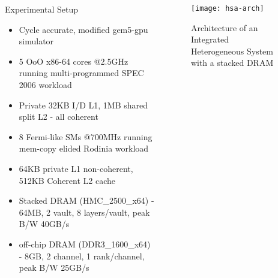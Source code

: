 \documentclass[final,t]{beamer}
\begin{document}
\begin{frame}[t,fragile]{}
\begin{columns}[t]
\begin{column}{.47\linewidth}

	\begin{exampleblock} {Experimental Setup}
	{
	\footnotesize
	\begin{itemize}
		\item Cycle accurate, modified gem5-gpu simulator
		\item 5 OoO x86-64 cores @2.5GHz running multi-programmed SPEC 2006 workload
		\item Private 32KB I/D L1, 1MB shared split L2 - all coherent
		\item 8 Fermi-like SMs @700MHz running mem-copy elided Rodinia workload
		\item 64KB private L1 non-coherent, 512KB Coherent L2 cache
		\item Stacked DRAM (HMC\_2500\_x64) - 64MB, 2 vault, 8 layers/vault, peak B/W 40GB/s
		\item off-chip DRAM (DDR3\_1600\_x64) - 8GB, 2 channel, 1 rank/channel, peak B/W 25GB/s
	\end{itemize}
	}
	\end{exampleblock}	
	
\end{column}


\begin{column}{.47\linewidth}

	\begin{figure}
		\centering
    	\texttt{[image: hsa-arch]} \\
    	\caption{Architecture of an Integrated Heterogeneous System with a stacked DRAM}
    \end{figure}


\end{column}
\end{columns}
\end{frame}
\end{document}
